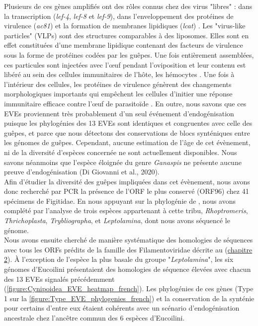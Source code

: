 Plusieurs de ces gènes amplifiés ont des rôles connus chez des virus "libres" : dans la transcription (\textit{lef-4}, \textit{lef-8} et \textit{lef-9}), dans l'enveloppement des protéines de virulence (\textit{ac81}) \citep{ dong_autographa_2016} et la formation de membranes lipidiques (\textit{lcat}) \citep{saeedi_review_2015}. Les "virus-like particles" (VLPs) sont des structures comparables à des liposomes. Elles sont en effet constituées d'une membrane lipidique contenant des facteurs de virulence sous la forme de protéines codées par les guêpes. Une fois entièrement assemblées, ces particules sont injectées avec l'œuf pendant l'oviposition et leur contenu est libéré au sein des cellules immunitaires de l'hôte, les hémocytes \citep{rizki_parasitoid_1990,colinet_convergent_2007}. Une fois à l'intérieur des cellules, les protéines de virulence génèrent des changements morphologiques importants qui empêchent les cellules d'initier une réponse immunitaire efficace contre l'œuf de parasitoïde \citep{colinet_convergent_2007}. En outre, nous savons que ces EVEs proviennent très probablement d'un seul événement d'endogénisation puisque les phylogénies des 13 EVEs sont identiques et congruentes avec celle des guêpes, et parce que nous détectons des conservations de blocs synténiques entre les génomes de guêpes. Cependant, aucune estimation de l'âge de cet évènement, ni de la diversité d'espèces concernée ne sont actuellement disponibles. Nous savons néanmoins que l'espèce éloignée du genre \textit{Ganaspis} ne présente aucune preuve d'endogénisation (Di Giovanni et al., 2020).\\

Afin d'étudier la diversité des guêpes impliquées dans cet évènement, nous avons donc recherché par PCR la présence de l'ORF le plus conservé (ORF96) chez 41 spécimens de Figitidae. En nous appuyant sur la phylogénie de \citep{blaimer_comprehensive_2020}, nous avons complété par l'analyse de trois espèces appartenant à cette tribu, \textit{Rhoptromeris}, \textit{Thrichoplasta}, \textit{Trybliographa}, et \textit{Leptolamina}, dont nous avons séquencé le génome.\\

Nous avons ensuite cherché de manière systématique des homologies de séquences avec tous les ORFs prédits de la famille des Filamentoviridae décrite au (\hyperref[sec:chap2]{chapitre 2}). À l'exception de l'espèce la plus basale du groupe "\textit{Leptolamina}", les six génomes d'Eucoilini présentaient des homologies de séquence élevées avec chacun des 13 EVEs signalés précédemment (\figurename{\ref{figure:Cynipoidea_EVE_heatmap_french}}). Les phylogénies de ces gènes (Type 1 sur la  \figurename{\ref{figure:Type_EVE_phylogenies_french}}) et la conservation de la synténie pour certains d'entre eux étaient cohérents avec un scénario d'endogénisation ancestrale chez l'ancêtre commun des 6 espèces d'Eucoilini. \\


